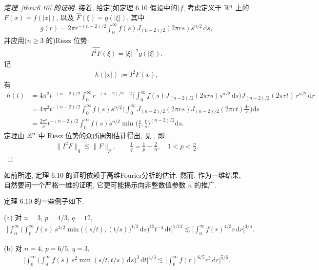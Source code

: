 \begin{proof}[定理~\ref{thm:6.10} 的证明]
接着, 给定(如定理 6.10 假设中的)$f$, 考虑定义于 $\mathbb{R}^n$ 上的 $F(x) = f(|x|)$, 以及 $\widehat{F}(\xi) = g(|\xi|)$, 其中
\begin{align*}
  g(r)=2\pi r^{-(n-2)/2}\int_{0}^{\infty}f(s)J_{(n-2)/2}(2\pi r s)s^{n/2}\,\mathrm{d}s,
\end{align*}
并应用($n \geq 3$ 的)Riesz 位势:
\begin{align*}
  \widehat{I^{2}F}(\xi)=|\xi|^{-2}g(|\xi|).
\end{align*}
记
\begin{align*}
  h(|x|):=I^{2}F(x),
\end{align*}
有
\begin{align*}
  h(t)
  &=4\pi^{2}t^{-(n-2)/2}\int_{0}^{\infty}r^{-(n-2)/2-2}
   \Big(\int_{0}^{\infty}f(s)J_{(n-2)/2}(2\pi r s)s^{n/2}\,\mathrm{d}s\Big)
   J_{(n-2)/2}(2\pi r t)\,r^{n/2}\,\mathrm{d}r\\
  &=4\pi^{2}t^{-(n-2)/2}\int_{0}^{\infty}f(s)s^{n/2}
   \Big(\int_{0}^{\infty}J_{(n-2)/2}(2\pi r s)J_{(n-2)/2}(2\pi r t)\frac{\mathrm{d}r}{r}\Big)\mathrm{d}s\\
  &=\frac{2\pi^{2}}{\nu}t^{-(n-2)/2}\int_{0}^{\infty}f(s)s^{n/2}
   \min\Big(\frac{s}{t},\frac{t}{s}\Big)^{(n-2)/2}\mathrm{d}s.
\end{align*}
定理由 $\mathbb{R}^n$ 中 Riesz 位势的众所周知估计得出, 见 \cite{b12}, 即
\begin{align*}
  \|I^{2}F\|_{q}\lesssim\|F\|_{p},\qquad
  \frac{1}{q}=\frac{1}{p}-\frac{2}{n},\quad 1<p<\frac{n}{2}.
\end{align*}
\end{proof}

如前所述, 定理 6.10 的证明依赖于高维Fourier分析的估计. 然而, 作为一维结果, 自然要问一个严格一维的证明, 它更可能揭示向非整数值参数 $n$ 的推广.

定理 6.10 的一些例子如下.

(a) 对 $n = 3$, $p = 4/3$, $q = 12$,
\begin{align*}
  \Big[\int_{0}^{\infty}\Big(\int_{0}^{\infty}f(s)\,s^{3/2}\min\bigl((s/t),(t/s)\bigr)^{1/2}\,\mathrm{d}s\Big)^{12}t^{-4}\,\mathrm{d}t\Big]^{1/12}
  \lesssim\Big[\int_{0}^{\infty}f(r)^{4/3}r\,\mathrm{d}r\Big]^{3/4}.
\end{align*}

(b) 对 $n = 4$, $p = 6/5$, $q = 3$,
\begin{align*}
  \Big[\int_{0}^{\infty}\Big(\int_{0}^{\infty}f(s)\,s^{2}\min(s/t,t/s)\,\mathrm{d}s\Big)^{3}\,\mathrm{d}t\Big]^{1/3}
  \lesssim\Big[\int_{0}^{\infty}f(r)^{6/5}r^{3}\,\mathrm{d}r\Big]^{5/6}.
\end{align*}

